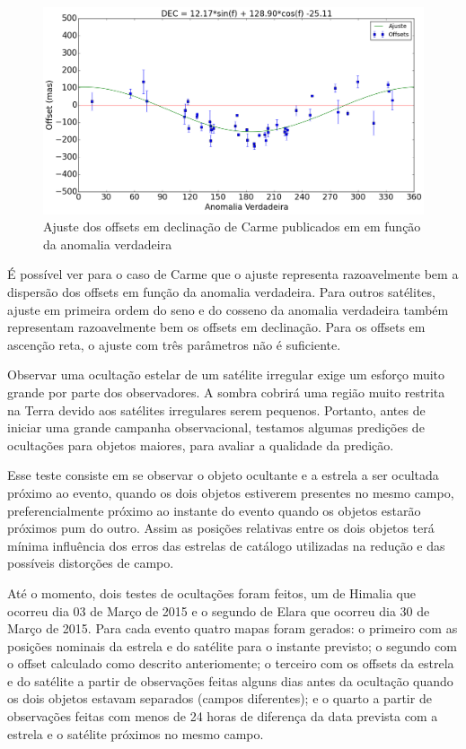 \documentclass[12pt,a4paper]{monografia}
\begin{document}
\begin{figure}
\begin{centering}
\includegraphics[scale=0.45]{figuras/Carme-DEC_fit.png} 
\caption{Ajuste dos offsets em declinação de Carme publicados em \cite{GomesJunior2015-Irregular} em função da anomalia verdadeira}
\label{Fig: Carme-dec-fit}
\end{centering}
\end{figure}

É possível ver para o caso de Carme que o ajuste representa razoavelmente bem a dispersão dos offsets em função da anomalia verdadeira. Para outros satélites, ajuste em primeira ordem do seno e do cosseno da anomalia verdadeira também representam razoavelmente bem os offsets em declinação. Para os offsets em ascenção reta, o ajuste com três parâmetros não é suficiente.

Observar uma ocultação estelar de um satélite irregular exige um esforço muito grande por parte dos observadores. A sombra cobrirá uma região muito restrita na Terra devido aos satélites irregulares serem pequenos. Portanto, antes de iniciar uma grande campanha observacional, testamos algumas predições de ocultações para objetos maiores, para avaliar a qualidade da predição.

Esse teste consiste em se observar o objeto ocultante e a estrela a ser ocultada próximo ao evento, quando os dois objetos estiverem presentes no mesmo campo, preferencialmente próximo ao instante do evento quando os objetos estarão próximos pum do outro. Assim as posições relativas entre os dois objetos terá mínima influência dos erros das estrelas de catálogo utilizadas na redução e das possíveis distorções de campo.

Até o momento, dois testes de ocultações foram feitos, um de Himalia que ocorreu dia 03 de Março de 2015 e o segundo de Elara que ocorreu dia 30 de Março de 2015. Para cada evento quatro mapas foram gerados: o primeiro com as posições nominais da estrela e do satélite para o instante previsto; o segundo com o offset calculado como descrito anteriomente; o terceiro com os offsets da estrela e do satélite a partir de observações feitas alguns dias antes da ocultação quando os dois objetos estavam separados (campos diferentes); e o quarto a partir de observações feitas com menos de 24 horas de diferença da data prevista com a estrela e o satélite próximos no mesmo campo.
\end{document}
